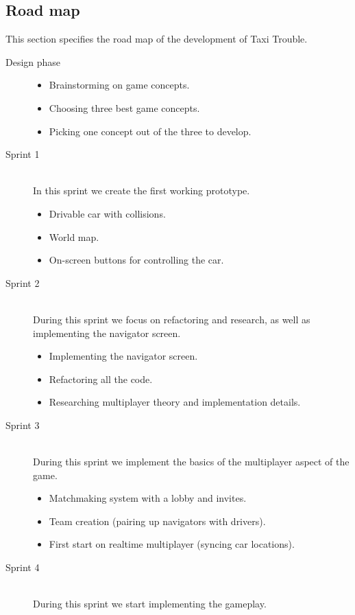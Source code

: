 \documentclass{article}
\begin{document}
\subsection{Road map}
This section specifies the road map of the development of Taxi Trouble.
\begin{description}
\item[Design phase] \hfill
\begin{itemize}
\item Brainstorming on game concepts.
\item Choosing three best game concepts.
\item Picking one concept out of the three to develop.
\end{itemize}
\item[Sprint 1] \hfill \\
In this sprint we create the first working prototype.
\begin{itemize}
\item Drivable car with collisions.
\item World map.
\item On-screen buttons for controlling the car.
\end{itemize}
\item[Sprint 2] \hfill \\
During this sprint we focus on refactoring and research, as well as implementing the navigator screen.
\begin{itemize}
\item Implementing the navigator screen.
\item Refactoring all the code.
\item Researching multiplayer theory and implementation details.
\end{itemize}
\item[Sprint 3] \hfill \\
During this sprint we implement the basics of the multiplayer aspect of the game.
\begin{itemize}
\item Matchmaking system with a lobby and invites.
\item Team creation (pairing up navigators with drivers).
\item First start on realtime multiplayer (syncing car locations).
\end{itemize}
\item[Sprint 4] \hfill \\
During this sprint we start implementing the gameplay.
\begin{itemize}

\end{itemize}
\end{description}
\end{document}
